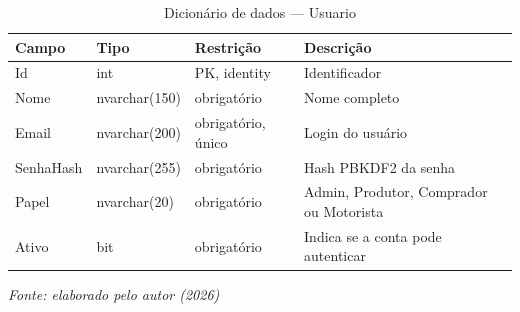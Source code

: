 \begin{table}[H]
  \centering
  \caption{Dicionário de dados --- Usuario}
  \label{tab:dic-usuario}
  \fontsize{9}{10.5}\selectfont
  \begin{tabular}{L{2.6cm}L{2.6cm}L{4.4cm}L{4.6cm}}
    \toprule
    \textbf{Campo} & \textbf{Tipo} & \textbf{Restrição} & \textbf{Descrição} \\
    \midrule
    Id & int & PK, identity & Identificador \\
    Nome & nvarchar(150) & obrigatório & Nome completo \\
    Email & nvarchar(200) & obrigatório, único & Login do usuário \\
    SenhaHash & nvarchar(255) & obrigatório & Hash PBKDF2 da senha \\
    Papel & nvarchar(20) & obrigatório & Admin, Produtor, Comprador ou Motorista \\
    Ativo & bit & obrigatório & Indica se a conta pode autenticar \\
    \bottomrule
  \end{tabular}

  \vspace{2pt}
  {\fontsize{9}{10.5}\selectfont\itshape Fonte: elaborado pelo autor (2026)}
\end{table}

